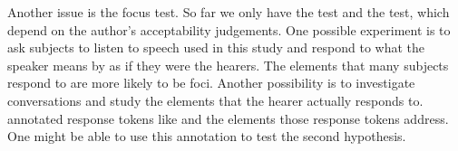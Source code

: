 Another issue is the focus test.
So far we only have the  test and the  test,
which depend on the author's acceptability judgements.
One possible experiment is to ask subjects to listen to speech used in this study
and respond to what the speaker means by 
as if they were the hearers.
The elements that many subjects respond to are more likely to be foci.
Another possibility is to investigate conversations and study the elements that the hearer actually responds to.
 annotated response tokens like  and the elements those response tokens address.
One might be able to use this annotation to test the second hypothesis.


